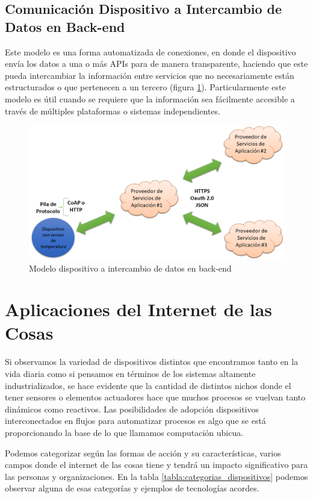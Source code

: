 \subsection{Comunicación Dispositivo a Intercambio de Datos en Back-end}
Este modelo es una forma automatizada de conexiones, en donde el dispositivo envía los datos a una o más APIs para de manera transparente, haciendo que este pueda intercambiar la información entre servicios que no necesariamente están estructurados o que pertenecen a un tercero (figura \ref{fig:d2b}). Particularmente este modelo es útil cuando se requiere que la información sea fácilmente accesible a través de múltiples plataformas o sistemas independientes.
\begin{figure}[htb]
\centering
\includegraphics[scale=0.4]{./Figuras/d2b.png}
\caption{Modelo dispositivo a intercambio de datos en back-end}
\label{fig:d2b}
\vspace*{-10pt}
\end{figure}

\section{Aplicaciones del Internet de las Cosas}
Si observamos la variedad de dispositivos distintos que encontramos tanto en la vida diaria como si pensamos en términos de los sistemas altamente industrializados, se hace evidente que la cantidad de distintos nichos donde el tener sensores o elementos actuadores hace que muchos procesos se vuelvan tanto dinámicos como reactivos. Las posibilidades de adopción dispositivos interconectados en flujos para automatizar procesos es algo que se está proporcionando la base de lo que llamamos computación ubicua.

Podemos categorizar según las formas de acción y su características, varios campos donde el internet de las cosas tiene y tendrá un impacto significativo para las personas y organizaciones. En la tabla \ref{tabla:categorias_dispositivos} podemos observar alguna de esas categorías y ejemplos de tecnologías acordes\cite{tablaiot}.

